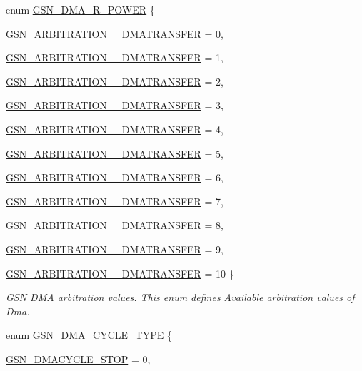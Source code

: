 \begin{DoxyCompactItemize}
enum \hyperlink{a00645_ga0dab047350d5c343038b0c017077dab7}{GSN\_\-DMA\_\-R\_\-POWER} \{ \par
\hyperlink{a00645_gga0dab047350d5c343038b0c017077dab7ac74ac5fa1175bc387937b6bc7ba3da77}{GSN\_\-ARBITRATION\_\_\-DMATRANSFER} =  0, 
\par
\hyperlink{a00645_gga0dab047350d5c343038b0c017077dab7a42ae3fcedf49db936b008bd50ae8072c}{GSN\_\-ARBITRATION\_\_\-DMATRANSFER} =  1, 
\par
\hyperlink{a00645_gga0dab047350d5c343038b0c017077dab7a2b53a376a12af3ac31c906c74ed1914f}{GSN\_\-ARBITRATION\_\_\-DMATRANSFER} =  2, 
\par
\hyperlink{a00645_gga0dab047350d5c343038b0c017077dab7a7e995ff22c877407b324332944e778ee}{GSN\_\-ARBITRATION\_\_\-DMATRANSFER} =  3, 
\par
\hyperlink{a00645_gga0dab047350d5c343038b0c017077dab7a27da9e0084aa1b51b2bb0853ddea9036}{GSN\_\-ARBITRATION\_\_\-DMATRANSFER} =  4, 
\par
\hyperlink{a00645_gga0dab047350d5c343038b0c017077dab7a4509d1db470e4622ceeb5093bc3ad534}{GSN\_\-ARBITRATION\_\_\-DMATRANSFER} =  5, 
\par
\hyperlink{a00645_gga0dab047350d5c343038b0c017077dab7a639f508d032a5dbf57d7b91c2da5504f}{GSN\_\-ARBITRATION\_\_\-DMATRANSFER} =  6, 
\par
\hyperlink{a00645_gga0dab047350d5c343038b0c017077dab7ae69c39e2419566697087b9bbd6e574e3}{GSN\_\-ARBITRATION\_\_\-DMATRANSFER} =  7, 
\par
\hyperlink{a00645_gga0dab047350d5c343038b0c017077dab7ab8d73acb8fe19c193ad43a0ccf3d8849}{GSN\_\-ARBITRATION\_\_\-DMATRANSFER} =  8, 
\par
\hyperlink{a00645_gga0dab047350d5c343038b0c017077dab7ae40c66cc1004676d5c628cf479f658c8}{GSN\_\-ARBITRATION\_\_\-DMATRANSFER} =  9, 
\par
\hyperlink{a00645_gga0dab047350d5c343038b0c017077dab7a9a6dd4b1c4e3039f312c7e123adee60b}{GSN\_\-ARBITRATION\_\_\-DMATRANSFER} =  10
 \}
\begin{DoxyCompactList}\small\item\em GSN DMA arbitration values. This enum defines Available arbitration values of Dma. \end{DoxyCompactList}\item 
enum \hyperlink{a00645_ga05b9b2e87ca35c2d0564ceca307d349c}{GSN\_\-DMA\_\-CYCLE\_\-TYPE} \{ \par
\hyperlink{a00645_gga05b9b2e87ca35c2d0564ceca307d349ca5eaed8b81e9aea1d36a55808cafc764a}{GSN\_\-DMACYCLE\_\-STOP} =  0, 

\end{DoxyCompactItemize}
